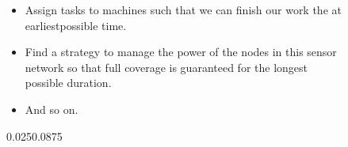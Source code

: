 \begin{frame}[t]
{{\begin{itemize}
%
\item<4-> Assign tasks to machines such that we can finish our work the at \alert{earliest}possible time.%
%
\item<5-> Find a strategy to manage the power of the nodes in this sensor\\network so that full coverage is guaranteed for the \alert{longest}\\possible duration.%
%
\item<6-> And so on.%
\end{itemize}%
}}{0.025}{0.0875}%
%
\end{frame}%
%
\global\let\sharedSlideTitle\relax%
%
